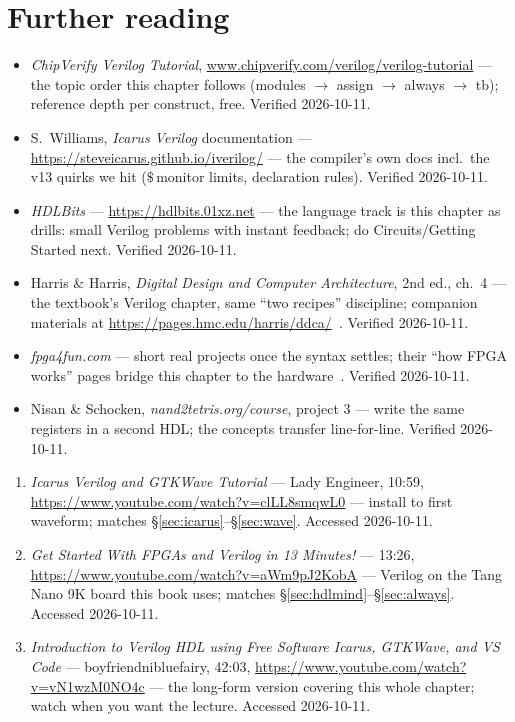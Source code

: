 \section*{Further reading}

\begin{itemize}
\item \emph{ChipVerify Verilog Tutorial},
\url{www.chipverify.com/verilog/verilog-tutorial} --- the
topic order this chapter follows (modules $\to$ assign $\to$ always
$\to$ tb); reference depth per construct, free. Verified 2026-10-11.
\item S.~Williams, \emph{Icarus Verilog} documentation ---
\url{https://steveicarus.github.io/iverilog/} --- the compiler's own
docs incl.\ the v13 quirks we hit ($\$\,$monitor limits, declaration
rules). Verified 2026-10-11.
\item \emph{HDLBits} --- \url{https://hdlbits.01xz.net} --- the
language track is this chapter as drills: small Verilog problems with
instant feedback; do Circuits/Getting Started next. Verified
2026-10-11.
\item Harris \& Harris, \emph{Digital Design and Computer
Architecture}, 2nd ed., ch.~4 --- the textbook's Verilog chapter,
same ``two recipes'' discipline; companion materials at
\url{https://pages.hmc.edu/harris/ddca/}~\cite{ddca}. Verified
2026-10-11.
\item \emph{fpga4fun.com} --- short real projects once the syntax
settles; their ``how FPGA works'' pages bridge this chapter to the
hardware~\cite{fpga4fun}. Verified 2026-10-11.
\item Nisan \& Schocken, \emph{nand2tetris.org/course}, project 3 ---
write the same registers in a second HDL; the concepts transfer
line-for-line. Verified 2026-10-11.
\end{itemize}

\begin{rulebox}
\begin{enumerate}
\item \emph{Icarus Verilog and GTKWave Tutorial} --- Lady Engineer,
10:59, \url{https://www.youtube.com/watch?v=clLL8smqwL0} --- install
to first waveform; matches \S\ref{sec:icarus}--\S\ref{sec:wave}.
Accessed 2026-10-11.
\item \emph{Get Started With FPGAs and Verilog in 13 Minutes!} ---
13:26, \url{https://www.youtube.com/watch?v=aWm9pJ2KobA} --- Verilog
on the Tang Nano 9K board this book uses; matches
\S\ref{sec:hdlmind}--\S\ref{sec:always}. Accessed 2026-10-11.
\item \emph{Introduction to Verilog HDL using Free Software Icarus,
GTKWave, and VS Code} --- boyfriendnibluefairy, 42:03,
\url{https://www.youtube.com/watch?v=vN1wzM0NO4c} --- the long-form
version covering this whole chapter; watch when you want the lecture.
Accessed 2026-10-11.
\end{enumerate}
\end{rulebox}

